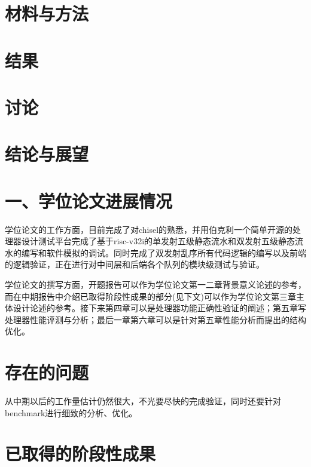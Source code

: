\documentclass[11pt]{article}
\begin{document}
\section{材料与方法}
\section{结果}
\section{讨论}
\section{结论与展望}
\section*{\huge{一、学位论文进展情况}}
学位论文的工作方面，目前完成了对chisel的熟悉，并用伯克利一个简单开源的处理器设计测试平台完成了基于risc-v32i的单发射五级静态流水和双发射五级静态流水的编写和软件模拟的调试。同时完成了双发射乱序所有代码逻辑的编写以及前端的逻辑验证，正在进行对中间层和后端各个队列的模块级测试与验证。

学位论文的撰写方面，开题报告可以作为学位论文第一二章背景意义论述的参考，而在中期报告中介绍已取得阶段性成果的部分(见下文)可以作为学位论文第三章主体设计论述的参考。接下来第四章可以是处理器功能正确性验证的阐述；第五章写处理器性能评测与分析；最后一章第六章可以是针对第五章性能分析而提出的结构优化。
\section*{\LARGE{存在的问题}}
从中期以后的工作量估计仍然很大，不光要尽快的完成验证，同时还要针对benchmark进行细致的分析、优化。
\section*{\LARGE{已取得的阶段性成果}}
\end{document}
